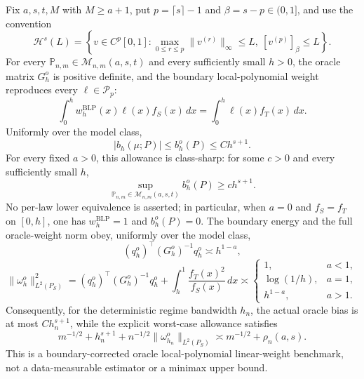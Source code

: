 Fix \(a,s,t,M\) with \(M\ge a+1\), put \(p=\lceil s\rceil-1\) and \(\beta=s-p\in(0,1]\), and use the convention
\[
\mathcal H^s(L)=\left\{v\in C^p[0,1]:
\max_{0\le r\le p}\|v^{(r)}\|_\infty\le L,
\ [v^{(p)}]_{\beta}\le L\right\}.
\]
For every \(\mathbb P_{n,m}\in\mathcal M_{n,m}(a,s,t)\) and every sufficiently small \(h>0\), the oracle matrix \(G_h^o\) is positive definite, and the boundary local-polynomial weight reproduces every \(\ell\in\mathcal P_p\):
\[
\int_0^h w_h^{\mathrm{BLP}}(x)\ell(x)f_S(x)\,dx
=\int_0^h\ell(x)f_T(x)\,dx.
\]
Uniformly over the model class,
\[
|b_h(\mu;P)|\le b_h^o(P)\le C h^{s+1}.
\]
For every fixed \(a>0\), this allowance is class-sharp: for some \(c>0\) and every sufficiently small \(h\),
\[
\sup_{\mathbb P_{n,m}\in\mathcal M_{n,m}(a,s,t)}b_h^o(P)\ge c h^{s+1}.
\]
No per-law lower equivalence is asserted; in particular, when \(a=0\) and \(f_S=f_T\) on \([0,h]\), one has \(w_h^{\mathrm{BLP}}=1\) and \(b_h^o(P)=0\). The boundary energy and the full oracle-weight norm obey, uniformly over the model class,
\[
(q_h^o)^\top(G_h^o)^{-1}q_h^o\asymp h^{1-a},
\]
\[
\|\omega_h^o\|_{L^2(P_S)}^2
=(q_h^o)^\top(G_h^o)^{-1}q_h^o
+\int_h^1\frac{f_T(x)^2}{f_S(x)}\,dx
\asymp
\begin{cases}
1,&a<1,\\
\log(1/h),&a=1,\\
h^{1-a},&a>1.
\end{cases}
\]
Consequently, for the deterministic regime bandwidth \(h_n\), the actual oracle bias is at most \(C h_n^{s+1}\), while the explicit worst-case allowance satisfies
\[
m^{-1/2}+h_n^{s+1}
+n^{-1/2}\|\omega_{h_n}^o\|_{L^2(P_S)}
\asymp m^{-1/2}+\rho_n(a,s).
\]
This is a boundary-corrected oracle local-polynomial linear-weight benchmark, not a data-measurable estimator or a minimax upper bound.